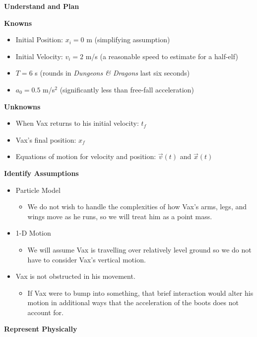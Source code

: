 \documentclass[]{article}
\begin{document}
\begin{TeacherMargin}
\noindent\textbf{Understand and Plan}
\vspace{-10pt}
\begin{multicols}{2}
	\noindent\textbf{Knowns}
	\begin{itemize}
		\item Initial Position: $x_{i} = 0$ m (simplifying assumption)
		\item Initial Velocity: $v_{i} = 2$ m/s (a reasonable speed to estimate for a half-elf)
		\item $T = 6$ s (rounds in \textit{Dungeons \& Dragons} last six seconds)
		\item $a_{0} = 0.5$ m/s$^{2}$ (significantly less than free-fall acceleration)
	\end{itemize}
	\noindent\textbf{Unknowns}
	\begin{itemize}
		\item When Vax returns to his initial velocity: $t_{f}$
		\item Vax's final position: $x_{f}$
		\item Equations of motion for velocity and position: $\vec{v}(t)$ and $\vec{x}(t)$
	\end{itemize}
\end{multicols}
\vspace{-10pt}
\noindent\textbf{Identify Assumptions}
\begin{itemize}
	\item Particle Model
	\begin{itemize}
		\item We do not wish to handle the complexities of how Vax's arms, legs, and wings move as he runs, so we will treat him as a point mass.
	\end{itemize}
	\item 1-D Motion
	\begin{itemize}
		\item We will assume Vax is travelling over relatively level ground so we do not have to consider Vax's vertical motion.
	\end{itemize}
	\item Vax is not obstructed in his movement.
	\begin{itemize}
		\item If Vax were to bump into something, that brief interaction would alter his motion in additional ways that the acceleration of the boots does not account for.
	\end{itemize}
\end{itemize}
\noindent\textbf{Represent Physically}
\vspace{-10pt}
\begin{center}
\end{center}
\end{TeacherMargin}
\end{document}
